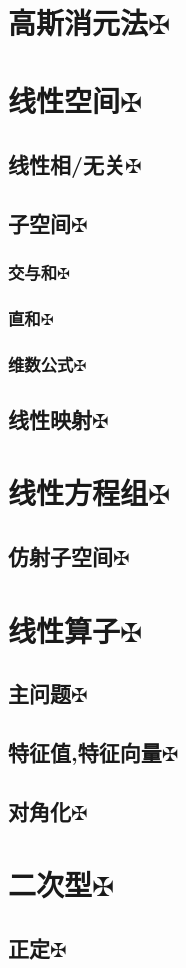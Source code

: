 \documentclass[11pt, a4paper, UTF8]{ctexart}
\begin{document}
\indent\\
\large
\raggedright
\def\fuck{\maltese}
\def\shit#1{#1\protect\hyperlink{catalog}{$\fuck$}}
\hypertarget{catalog}{}
\tableofcontents
\setcounter{secnumdepth}{-1}
\section{\shit{高斯消元法}}
\section{\shit{线性空间}}
\subsection{\shit{线性相/无关}}
\subsection{\shit{子空间}}
\subsubsection{\shit{交与和}}
\subsubsection{\shit{直和}}
\subsubsection{\shit{维数公式}}
\subsection{\shit{线性映射}}
\section{\shit{线性方程组}}
\subsection{\shit{仿射子空间}}
\section{\shit{线性算子}}
\subsection{\shit{主问题}}
\subsection{\shit{特征值,特征向量}}
\subsection{\shit{对角化}}
\section{\shit{二次型}}
\subsection{\shit{正定}}
\end{document}
